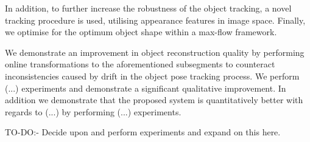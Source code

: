 In addition, to further increase the robustness of the object tracking, a novel tracking procedure is used, utilising appearance features
in image space. Finally, we optimise for the optimum object shape within a max-flow framework.

We demonstrate an improvement in object reconstruction quality by performing online transformations to the aforementioned subsegments to counteract inconsistencies 
caused by drift in the object pose tracking process. 
We perform (...) experiments and demonstrate a significant qualitative improvement. In addition we demonstrate that the proposed system is quantitatively better 
with regards to (...) by performing (...) experiments.

TO-DO:- Decide upon and perform experiments and expand on this here.